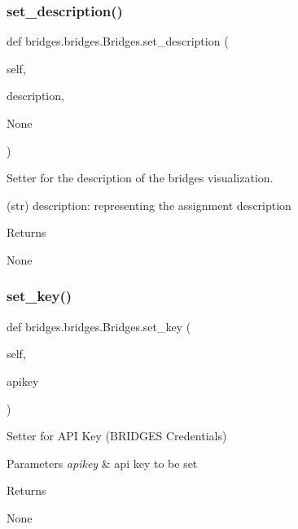 \subsubsection{\texorpdfstring{set\+\_\+description()}{set\_description()}}
{\footnotesize\ttfamily def bridges.\+bridges.\+Bridges.\+set\+\_\+description (\begin{DoxyParamCaption}\item[{}]{self,  }\item[{}]{description,  }\item[{}]{None }\end{DoxyParamCaption})}



Setter for the description of the bridges visualization. 

(str) description\+: representing the assignment description \begin{DoxyReturn}{Returns}


None 
\end{DoxyReturn}
\mbox{\label{classbridges_1_1bridges_1_1_bridges_a5841bc54e3663249e76f4b34f5a3a593}} 
\subsubsection{\texorpdfstring{set\+\_\+key()}{set\_key()}}
{\footnotesize\ttfamily def bridges.\+bridges.\+Bridges.\+set\+\_\+key (\begin{DoxyParamCaption}\item[{}]{self,  }\item[{}]{apikey }\end{DoxyParamCaption})}



Setter for A\+PI Key (B\+R\+I\+D\+G\+ES Credentials) 


\begin{DoxyParams}{Parameters}
{\em apikey} & api key to be set \\
\hline
\end{DoxyParams}
\begin{DoxyReturn}{Returns}


None 
\end{DoxyReturn}
\mbox{\label{classbridges_1_1bridges_1_1_bridges_ae9ed34b5878d9d120949da0b7e4d2911}} 

